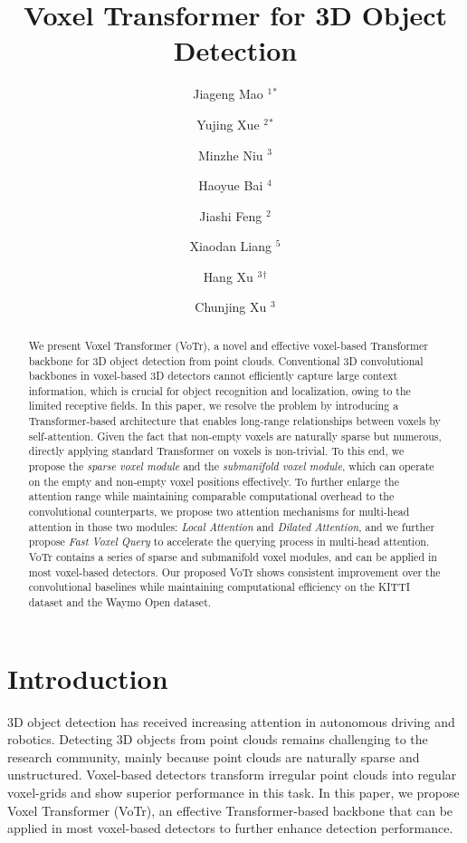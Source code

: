 \documentclass[10pt,twocolumn,letterpaper]{article}
\begin{document}
\title{Voxel Transformer for 3D Object Detection}

\author{Jiageng Mao $^1$$^*$
\and
Yujing Xue $^2$$^*$
\and
Minzhe Niu $^3$
\and
Haoyue Bai $^4$
\and
Jiashi Feng $^2$
\and
Xiaodan Liang $^5$
\and
Hang Xu $^3$$^{\dag}$
\and
Chunjing Xu $^3$
}

\maketitle
\ificcvfinal\thispagestyle{empty}\fi

\begin{abstract}
We present Voxel Transformer (VoTr), a novel and effective voxel-based Transformer backbone for 3D object detection from point clouds. Conventional 3D convolutional backbones in voxel-based 3D detectors cannot efficiently capture large context information, which is crucial for object recognition and localization, owing to the limited receptive fields. In this paper, we resolve the problem by introducing a Transformer-based architecture that enables long-range relationships between voxels by self-attention. Given the fact that non-empty voxels are naturally sparse but numerous, directly applying standard Transformer on voxels is non-trivial. To this end, we propose the \textit{sparse voxel module} and the \textit{submanifold voxel module}, which can operate on the empty and non-empty voxel positions effectively. To further enlarge the attention range while maintaining comparable computational overhead to the convolutional counterparts, we propose two attention mechanisms for multi-head attention in those two modules: \textit{Local Attention} and \textit{Dilated Attention}, and we further propose \textit{Fast Voxel Query} to accelerate the querying process in multi-head attention. VoTr contains a series of sparse and submanifold voxel modules, and can be applied in most voxel-based detectors. Our proposed VoTr shows consistent improvement over the convolutional baselines while maintaining computational efficiency on the KITTI dataset and the Waymo Open dataset.
\end{abstract}

\let\thefootnote\relax{}

\section{Introduction}
3D object detection has received increasing attention in autonomous driving and robotics. Detecting 3D objects from point clouds remains challenging to the research community, mainly because point clouds are naturally sparse and unstructured. Voxel-based detectors transform irregular point clouds into regular voxel-grids and show superior performance in this task. In this paper, we propose Voxel Transformer (VoTr), an effective Transformer-based backbone that can be applied in most voxel-based detectors to further enhance detection performance. 
\end{document}
